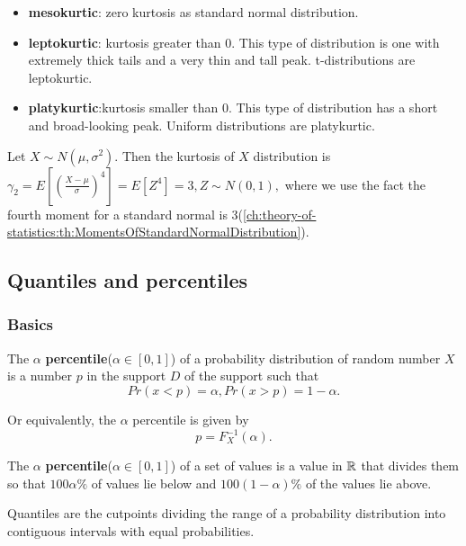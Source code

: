 \begin{refsection}
\begin{remark}\hfill
	\begin{itemize}
		\item \textbf{mesokurtic}: zero kurtosis as standard normal distribution.
		\item \textbf{leptokurtic}: kurtosis greater than 0.  This type of distribution is one with extremely thick tails and a very thin and tall peak.  t-distributions are leptokurtic.
		\item \textbf{platykurtic}:kurtosis smaller than 0. This type of distribution has a short and broad-looking peak. Uniform distributions are platykurtic.
	\end{itemize}
\end{remark}

\begin{example}
	Let $X\sim N(\mu,\sigma^2)$. Then the kurtosis of $X$ distribution is
	$\gamma_2 = E[(\frac{X-\mu}{\sigma})^4] = E[Z^4] = 3, Z\sim N(0,1),$
	where we use the fact the fourth moment for a standard normal is 3(\autoref{ch:theory-of-statistics:th:MomentsOfStandardNormalDistribution}). 	
\end{example}

\subsection{Quantiles and percentiles}
\subsubsection{Basics}

\begin{definition}
The $\alpha$ \textbf{percentile}($\alpha\in [0,1]$) of a probability distribution of random number $X$ is a  number $p$ in the support $D$ of the support such that
$$Pr(x < p) = \alpha, Pr(x > p) = 1-\alpha.$$

Or equivalently, the $\alpha$ percentile is given by
$$p = F^{-1}_X(\alpha).$$
\end{definition}

\begin{definition}
	The $\alpha$ \textbf{percentile}($\alpha\in [0,1]$) of a set of values is a value in $\mathbb{R}$ that divides them so that $100\alpha\%$ of values lie below and $100(1 - \alpha)\%$ of the values lie above. 
\end{definition}


\begin{definition}
	Quantiles are the cutpoints dividing the range of a probability distribution into contiguous intervals with equal probabilities. 	
\end{definition}



\end{refsection}

